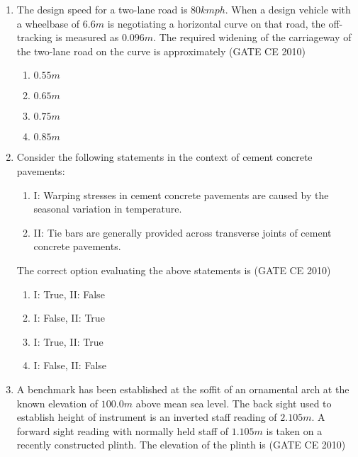 \documentclass[journal]{IEEEtran}
\begin{document}
\begin{enumerate}
    \item The design speed for a two-lane road is $80kmph$. When a design vehicle with a wheelbase of $6.6m$ is negotiating a horizontal curve on  
    that road, the off-tracking is measured as $0.096m$. The required widening of the carriageway of the two-lane road on the curve is approximately   \hfill (GATE CE 2010)

    \begin{multicols}{4}
        \begin{enumerate}
            \item $0.55 m$
            \item $0.65 m$
            \item $0.75 m$
            \item $0.85 m$
        \end{enumerate}
    \end{multicols}

    \item Consider the following statements in the context of cement concrete pavements:
    \begin{enumerate}
        \item[] I: Warping stresses in cement concrete pavements are caused by the seasonal variation in temperature.
        \item[] II: Tie bars are generally provided across transverse joints of cement concrete pavements.
    \end{enumerate}
    The correct option evaluating the above statements  
    is \hfill (GATE CE 2010)
    \begin{multicols}{2}
        \begin{enumerate}
            \item I: True, II: False
            \item I: False, II: True
            \item I: True, II: True
            \item I: False, II: False
        \end{enumerate}
    \end{multicols}


    \item A benchmark has been established at the soffit of an ornamental arch at the known elevation of $100.0 m$ above mean sea level. The back sight used to establish height of instrument is an inverted staff reading of $2.105 m$. A forward sight reading with normally held staff of $1.105 m$ is taken on a recently constructed plinth. The elevation of the plinth is \hfill (GATE CE 2010)


\end{enumerate}
\end{document}
